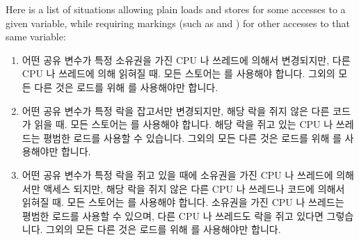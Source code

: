 Here is a list of situations
allowing plain loads and stores for some accesses to a given variable,
while requiring markings (such as  and )
for other accesses to that same variable:

\fi

\begin{enumerate}
\item	어떤 공유 변수가 특정 소유권을 가진 CPU 나 쓰레드에 의해서 변경되지만,
	다른 CPU 나 쓰레드에 의해 읽혀질 때.
	모든 스토어는  를 사용해야 합니다.
	그외의 모든 다른 것은 로드를 위해  를 사용해야만
	합니다.
\item	어떤 공유 변수가 특정 락을 잡고서만 변경되지만, 해당 락을 쥐지 않은
	다른 코드가 읽을 때.
	모든 스토어는  를 사용해야 합니다.
	해당 락을 쥐고 있는 CPU 나 쓰레드는 평범한 로드를 사용할 수 있습니다.
	그외의 모든 다른 것은 로드를 위해  를 사용해야만
	합니다.
\item	어떤 공유 변수가 특정 락을 쥐고 있을 때에 소유권을 가진 CPU 나 쓰레드에
	의해서만 액세스 되지만, 해당 락을 쥐지 않은 다른 CPU 나 쓰레드나 코드에
	의해서 읽혀질 때.
	모든 스토어는  를 사용해야 합니다.
	소유권을 가진 CPU 나 쓰레드는 평범한 로드를 사용할 수 있으며, 다른 CPU
	나 쓰레드도 락을 쥐고 있다면 그렇습니다.
	그외의 모든 다른 것은 로드를 위해  를 사용해야만
	합니다.

\end{enumerate}
